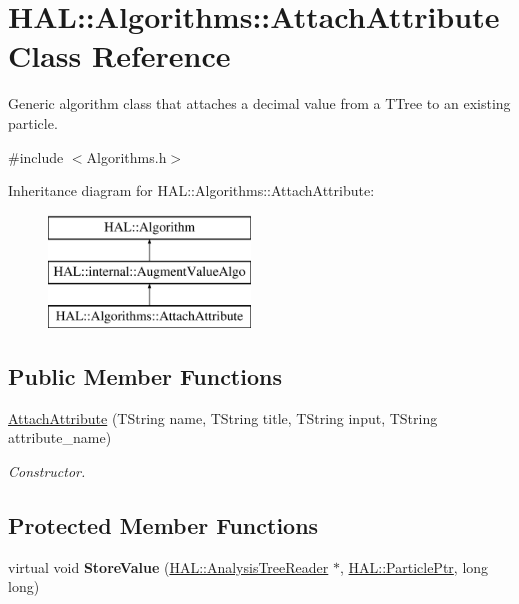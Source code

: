 \hypertarget{class_h_a_l_1_1_algorithms_1_1_attach_attribute}{\section{H\+A\+L\+:\+:Algorithms\+:\+:Attach\+Attribute Class Reference}
\label{class_h_a_l_1_1_algorithms_1_1_attach_attribute}
}


Generic algorithm class that attaches a decimal value from a T\+Tree to an existing particle.  




{\ttfamily \#include $<$Algorithms.\+h$>$}

Inheritance diagram for H\+A\+L\+:\+:Algorithms\+:\+:Attach\+Attribute\+:\begin{figure}[H]
\begin{center}
\leavevmode
\includegraphics[height=3.000000cm]{class_h_a_l_1_1_algorithms_1_1_attach_attribute}
\end{center}
\end{figure}
\subsection*{Public Member Functions}
\begin{DoxyCompactItemize}
\item 
\hyperlink{class_h_a_l_1_1_algorithms_1_1_attach_attribute_a0c161228d7ba4e6b987d4d9d37375dde}{Attach\+Attribute} (T\+String name, T\+String title, T\+String input, T\+String attribute\+\_\+name)
\begin{DoxyCompactList}\small\item\em Constructor. \end{DoxyCompactList}\end{DoxyCompactItemize}
\subsection*{Protected Member Functions}
\begin{DoxyCompactItemize}
\item 
\hypertarget{class_h_a_l_1_1_algorithms_1_1_attach_attribute_afc87e37a8075b9486c1ec8b46c38b401}{virtual void {\bfseries Store\+Value} (\hyperlink{class_h_a_l_1_1_analysis_tree_reader}{H\+A\+L\+::\+Analysis\+Tree\+Reader} $\ast$, \hyperlink{class_h_a_l_1_1_generic_particle}{H\+A\+L\+::\+Particle\+Ptr}, long long)}\label{class_h_a_l_1_1_algorithms_1_1_attach_attribute_afc87e37a8075b9486c1ec8b46c38b401}

\end{DoxyCompactItemize}



